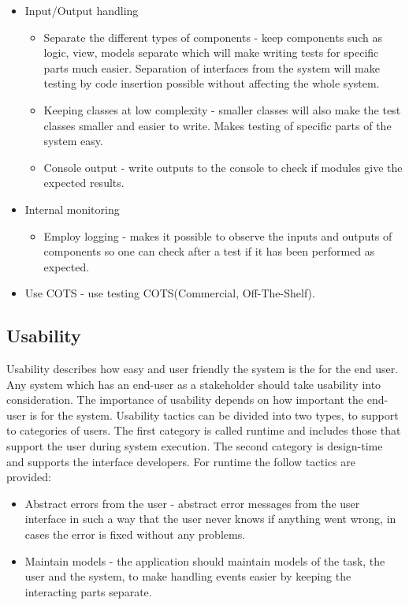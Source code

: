 \begin{itemize}
	\item Input/Output handling
        \begin{itemize}
	\item Separate the different types of components - keep components such as logic, view, models separate which will make writing tests for specific parts much easier. Separation of interfaces from the system will make testing by code insertion possible without affecting the whole system.
	\item Keeping classes at low complexity - smaller classes will also make the test classes smaller and easier to write. Makes testing of specific parts of the system easy.
	\item Console output - write outputs to the console to check if modules give the expected results.
	\end{itemize}
    
	\item Internal monitoring
        \begin{itemize}	
        \item Employ logging - makes it possible to observe the inputs and outputs of components so one can check after a test if it has been performed as expected.
        \end{itemize}
	\item Use COTS - use testing COTS(Commercial, Off-The-Shelf).
\end{itemize}


\subsection{Usability}
Usability describes how easy and user friendly the system is the for the end user. Any system which has an end-user as a stakeholder should take usability into consideration. The importance of usability depends on how important the end-user is for the system. Usability tactics can be divided into two types, to support to categories of users. The first category is called runtime and includes those that support the user during system execution. The second category is design-time and supports the interface developers.\cite{bass2003software} For runtime the follow tactics are provided:

\begin{itemize}
	\item Abstract errors from the user - abstract error messages from the user interface in such a way that the user never knows if anything went wrong, in cases the error is fixed without any problems.
	\item Maintain models - the application should maintain models of the task, the user and the system, to make handling events easier by keeping the interacting parts separate.
\end{itemize}

